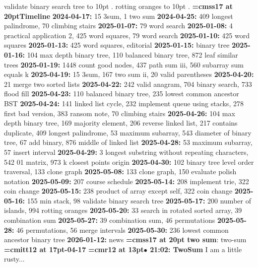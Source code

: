 \smallskip
{} validate binary search tree \leaders\hbox to 10pt {\hss.\hss}  \hfill {}
\smallskip
{} rotting oranges \leaders\hbox to 10pt {\hss.\hss}  \hfill {}
\smallskip
\vfill \break
{\medskip\noindent\bf\font\titlefont=cmss17 at 20pt\titlefont Timeline}\medskip
{\noindent \bf 2024-04-17:} 15 3sum, 1 two sum\smallskip
{\noindent \bf 2024-04-25:} 409 longest palindrome, 70 climbing stairs\smallskip
{\noindent \bf 2025-01-07:} 79 word search\smallskip
{\noindent \bf 2025-01-08:} 4 practical application 2, 425 word squares, 79 word search\smallskip
{\noindent \bf 2025-01-10:} 425 word squares\smallskip
{\noindent \bf 2025-01-13:} 425 word squares, editorial\smallskip
{\noindent \bf 2025-01-15:} binary tree\smallskip
{\noindent \bf 2025-01-16:} 104 max depth binary tree, 110 balanced binary tree, 872 leaf similar trees\smallskip
{\noindent \bf 2025-01-19:} 1448 count good nodes, 437 path sum iii, 560 subarray sum equals k\smallskip
{\noindent \bf 2025-04-19:} 15 3sum, 167 two sum ii, 20 valid parentheses\smallskip
{\noindent \bf 2025-04-20:} 21 merge two sorted lists\smallskip
{\noindent \bf 2025-04-22:} 242 valid anagram, 704 binary search, 733 flood fill\smallskip
{\noindent \bf 2025-04-23:} 110 balanced binary tree, 235 lowest common ancestor BST\smallskip
{\noindent \bf 2025-04-24:} 141 linked list cycle, 232 implement queue using stacks, 278 first bad version, 383 ransom note, 70 climbing stairs\smallskip
{\noindent \bf 2025-04-26:} 104 max depth binary tree, 169 majority element, 206 reverse linked list, 217 contains duplicate, 409 longest palindrome, 53 maximum subarray, 543 diameter of binary tree, 67 add binary, 876 middle of linked list\smallskip
{\noindent \bf 2025-04-28:} 53 maximum subarray, 57 insert interval\smallskip
{\noindent \bf 2025-04-29:} 3 longest substring without repeating characters, 542 01 matrix, 973 k closest points origin\smallskip
{\noindent \bf 2025-04-30:} 102 binary tree level order traversal, 133 clone graph\smallskip
{\noindent \bf 2025-05-08:} 133 clone graph, 150 evaluate polish notation\smallskip
{\noindent \bf 2025-05-09:} 207 course schedule\smallskip
{\noindent \bf 2025-05-14:} 208 implement trie, 322 coin change\smallskip
{\noindent \bf 2025-05-15:} 238 product of array except self, 322 coin change\smallskip
{\noindent \bf 2025-05-16:} 155 min stack, 98 validate binary search tree\smallskip
{\noindent \bf 2025-05-17:} 200 number of islands, 994 rotting oranges\smallskip
{\noindent \bf 2025-05-20:} 33 search in rotated sorted array, 39 combination sum\smallskip
{\noindent \bf 2025-05-27:} 39 combination sum, 46 permutations\smallskip
{\noindent \bf 2025-05-28:} 46 permutations, 56 merge intervals\smallskip
{\noindent \bf 2025-05-30:} 236 lowest common ancestor binary tree\smallskip
{\noindent \bf 2026-01-12:} news\smallskip
\vfill \break
{}
{\medskip\noindent\bf\font\titlefont=cmss17 at 20pt two sum}: two-sum
{\medskip\noindent\bf\font\titlefont=cmitt12 at 17pt-04-17}\medskip
{\smallskip\noindent\bf\font\titlefont=cmr12 at 13pt\titlefont $\bullet$ 21:02: TwoSum}\smallskip
I am a little rusty...
\par


